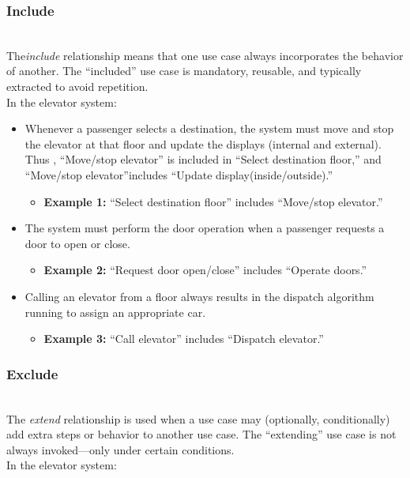 \subsubsection{Include}\label{6A2KjLmjIMFRzwwArTemM}
\\
The\emph{include} relationship means that one use case always incorporates the behavior of another. The ``included'' use case is mandatory, reusable, and typically extracted to avoid repetition.
\\
In the elevator system:

\begin{itemize}
\item
\protect{}\label{NnkqlfEfaOfhDncT_KGoZ}
Whenever a passenger selects a destination, the system must move and stop the elevator at that floor and update the displays (internal and external). Thus , ``Move/stop elevator'' is included in ``Select destination floor,'' and ``Move/stop elevator''includes ``Update display(inside/outside).''

\begin{itemize}
\item
\textbf{Example 1:} ``Select destination floor'' includes ``Move/stop elevator.''
\end{itemize}
\item
\protect{}\label{zCPEpTNV6gOIlMLx8lKPe}
The system must perform the door operation when a passenger requests a door to open or close.

\begin{itemize}
\item
\textbf{Example 2:} ``Request door open/close'' includes ``Operate doors.''
\end{itemize}
\item
\protect{}\label{UC6hmtVEEd4yZvm7eh5Pq}
Calling an elevator from a floor always results in the dispatch algorithm running to assign an appropriate car.

\begin{itemize}
\item
\textbf{Example 3:} ``Call elevator'' includes ``Dispatch elevator.''
\end{itemize}
\end{itemize}

\subsubsection{Exclude}\label{rFTmSncwQyU5EsPVJJKL2}
\\
The \emph{extend} relationship is used when a use case may (optionally, conditionally) add extra steps or behavior to another use case. The ``extending'' use case is not always invoked---only under certain conditions.
\\
In the elevator system:

